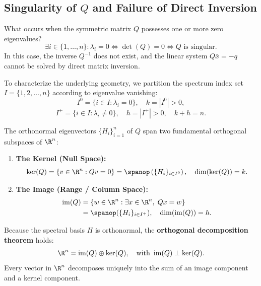 \subsection{Singularity of \texorpdfstring{$Q$}{Q} and Failure of Direct Inversion}
What occurs when the symmetric matrix $Q$ possesses one or more zero eigenvalues?
\begin{equation}
    \exists i \in \{1, \dots, n\} : \lambda_i = 0 \iff \det(Q) = 0 \iff Q \text{ is singular}.
\end{equation}
In this case, the inverse $Q^{-1}$ does not exist, and the linear system $Q \bar{x} = -q$ cannot be solved by direct matrix inversion.

To characterize the underlying geometry, we partition the spectrum index set $I = \{1, 2, \dots, n\}$ according to eigenvalue vanishing:
\begin{equation}
    I^0 = \{i \in I : \lambda_i = 0\}, \quad k = |I^0| > 0,
\end{equation}
\begin{equation}
    I^+ = \{i \in I : \lambda_i \neq 0\}, \quad h = |I^+| > 0, \quad k + h = n.
\end{equation}

The orthonormal eigenvectors $\{H_i\}_{i=1}^n$ of $Q$ span two fundamental orthogonal subspaces of $\R^n$:
\begin{enumerate}
    \item \textbf{The Kernel (Null Space):}
    \begin{equation}
        \ker(Q) = \{v \in \R^n : Qv = 0\} = \spanop\left(\{H_i\}_{i \in I^0}\right), \quad \dim(\ker(Q)) = k.
    \end{equation}
    \item \textbf{The Image (Range / Column Space):}
    \begin{align}
        \operatorname{im}(Q) &= \{w \in \R^n : \exists x \in \R^n, \; Qx = w\} \nonumber \\
        &= \spanop(\{H_i\}_{i \in I^+}), \quad \dim(\operatorname{im}(Q)) = h.
    \end{align}
\end{enumerate}

Because the spectral basis $H$ is orthonormal, the \textbf{orthogonal decomposition theorem} holds:
\begin{equation}
    \R^n = \operatorname{im}(Q) \oplus \ker(Q), \quad \text{with } \operatorname{im}(Q) \perp \ker(Q).
\end{equation}
Every vector in $\R^n$ decomposes uniquely into the sum of an image component and a kernel component.

